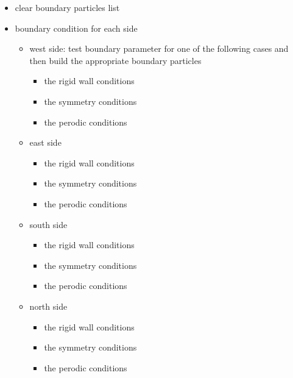 \begin{itemize}
\item clear boundary particles list

\item boundary condition for each side

\begin{itemize}
\item west side: test boundary parameter for one of the following cases and then build the appropriate boundary particles

\begin{itemize}
\item the rigid wall conditions

\item the symmetry conditions

\item the perodic conditions \end{itemize}


\item east side

\begin{itemize}
\item the rigid wall conditions

\item the symmetry conditions

\item the perodic conditions\end{itemize}


\item south side

\begin{itemize}
\item the rigid wall conditions

\item the symmetry conditions

\item the perodic conditions\end{itemize}


\item north side

\begin{itemize}
\item the rigid wall conditions

\item the symmetry conditions

\item the perodic conditions\end{itemize}
\end{itemize}



\end{itemize}
